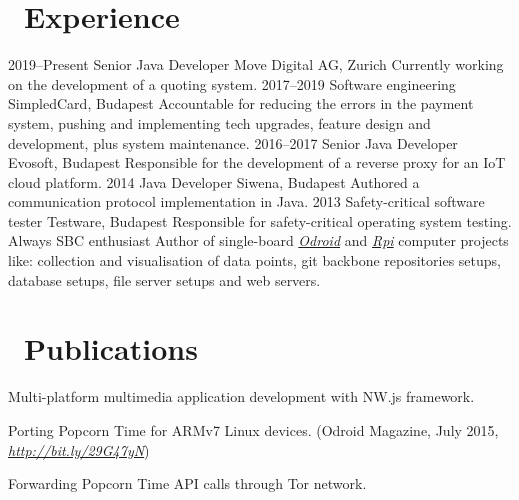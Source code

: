 \documentclass[hidelinks,11pt]{friggeri-cv}
\def\book{{\FA \faBook}}
\def\suitcase{{\FA \faSuitcase}}
\begin{document}
\section{{\suitcase}\ Experience}
\begin{entrylist}
    \entry
    {2019--Present}
    {Senior Java Developer}
    {Move Digital AG, Zurich}
    {Currently working on the development of a quoting system.}
    \entry
    {2017--2019}
    {Software engineering}
    {SimpledCard, Budapest}
    {Accountable for reducing the errors in the payment system, pushing and implementing tech upgrades, feature design and development, plus system maintenance.}
    \entry
    {2016--2017}
    {Senior Java Developer}
    {Evosoft, Budapest}
    {Responsible for the development of a reverse proxy for an IoT cloud platform.}
    \entry
    {2014}
    {Java Developer}
    {Siwena, Budapest}
    {Authored a communication protocol implementation in Java.}
    \entry
    {2013}
    {Safety-critical software tester}
    {Testware, Budapest}
    {Responsible for safety-critical operating system testing.}
    \entry
    {Always}
    {SBC enthusiast}
    {}
    {Author of single-board \textit{\href{http://www.hardkernel.com/main/main.php}{Odroid}} and \textit{\href{https://www.raspberrypi.org}{Rpi}} computer projects like: collection and visualisation of data points, git backbone repositories setups, database setups, file server setups and web servers.}
\end{entrylist}

\section{{\book}\ Publications}
Multi-platform multimedia application development with NW.js framework.

Porting Popcorn Time for ARMv7 Linux devices.
{\small (Odroid Magazine, July 2015, \textit{\href{http://bit.ly/29G47yN}{http://bit.ly/29G47yN}})}

Forwarding Popcorn Time API calls through Tor network.
\end{document}
